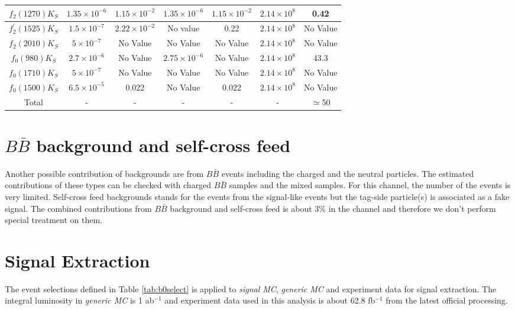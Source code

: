 \begin{table}
\begin{tabular}{|c|c|c|c|c|c|c|}
		\hline
		$f_2(1270)K_S$ & $1.35\times 10^{-6}$ & $1.15\times 10^{-2}$ & $1.35\times 10^{-6}$ & $1.15\times 10^{-2}$ & $2.14\times 10^8$ & 0.42 \\
		\hline
		$f_{2}^{'}(1525)K_S$ & $1.5\times 10^{-7} $ & $2.22\times 10^{-2}$ & No value & 0.22 & $2.14\times 10^8$ & No Value \\
		\hline
		$f_2(2010)K_S$ & $5\times 10^{-7}$ & No Value  & No Value  & No Value  & $2.14\times 10^8$ & No Value \\
		\hline
		$f_0(980)K_S$ & $2.7\times 10^{-6}$ & No Value & $2.75\times 10^{-6}$ & No Value & $2.14\times 10^8$ & 43.3 \\
		\hline
		$f_0(1710)K_S$ & $5\times 10^{-7}$ & No Value  & No Value  & No Value  & $2.14\times 10^8$ & No Value \\
		\hline
		$f_0(1500)K_S$ & $6.5\times 10^{-5}$ & 0.022 & No Value & 0.022 & $2.14\times 10^8$ & No Value \\
		\hline
		Total  & - & - & - & - & - & $\simeq$50 \\
		\hline
	\end{tabular}
\end{table}


\section{$B\bar{B}$ background and self-cross feed}
Another possible contribution of backgrounds are from $B\bar{B}$ events including the charged and the neutral particles. The estimated contributions of these types can be checked with charged $B\bar{B}$ samples and the mixed samples. For this channel, the number of the events is very limited. Self-cross feed backgrounds stands for the events from the signal-like events but the tag-side particle(s) is associated as a fake signal. The combined contributions from $B\bar{B}$ background and self-cross feed is about 3\% in the channel and therefore we don't perform special treatment on them.

\section{Signal Extraction}
The event selections defined in Table \ref{tab:b0select} is applied to \textit{signal MC}, \textit{generic MC} and experiment data for signal extraction. The integral luminosity in \textit{generic MC} is 1 ab$^{-1}$ and experiment data used in this analysis is about 62.8 fb$^{-1}$ from the latest official processing. 

